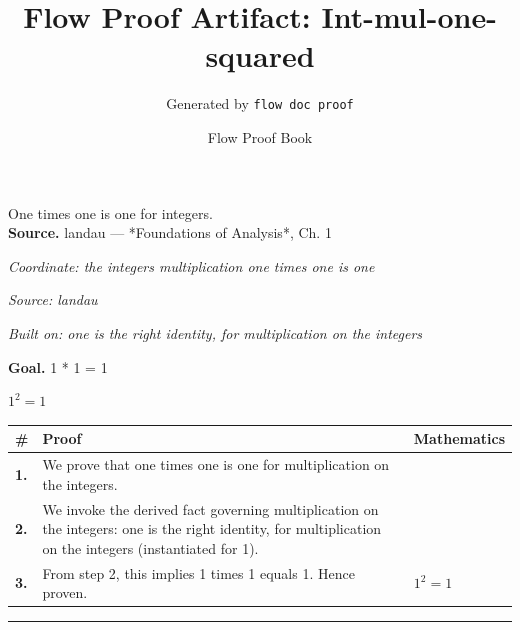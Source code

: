 \documentclass[11pt]{article}
\title{Flow Proof Artifact: Int-mul-one-squared}
\author{Generated by \texttt{flow doc proof}}
\date{Flow Proof Book}
\theoremstyle{definition}
\begin{document}
\maketitle
One times one is one for integers.\\[0.5em]
\textbf{Source.} landau — *Foundations of Analysis*, Ch. 1\\[0.5em]
\bigskip
{}\par
\smallskip\noindent\textit{Coordinate: the integers \cdot multiplication \cdot one times one is one}\par
\smallskip\noindent\textit{Source: landau}\par
\smallskip\noindent\textit{Built on: one is the right identity, for multiplication on the integers}\par
\medskip
\noindent\textbf{Goal.} 1 * 1 = 1\par
\noindent$\displaystyle 1^{2} = 1$\par
\medskip
\noindent
\begin{tabular}{@{} >{\raggedright\arraybackslash}p{} >{\raggedright\arraybackslash}p{} >{\raggedleft\arraybackslash}p{} @{}}
\textbf{\#} & \textbf{Proof} & \textbf{Mathematics} \\
\midrule
\textbf{1.} & We prove that one times one is one for multiplication on the integers. & \\[0.45em]
\textbf{2.} & We invoke the derived fact governing multiplication on the integers: one is the right identity, for multiplication on the integers (instantiated for 1). & \\[0.45em]
\textbf{3.} & From step 2, this implies 1 times 1 equals 1. Hence proven. & $\displaystyle 1^{2} = 1$ \\[0.45em]
\bottomrule
\end{tabular}
\label{thm:Int-multiplication-one_times_one_is_one}
\par\medskip\hrule
\end{document}
